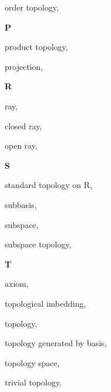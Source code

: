 \begin{multicols}{2}
order topology, \pageref{def:OrderTopology}

\vspace{1em}\noindent\large{\textbf{P}}

product topology, \pageref{def:ProductTopology}

projection, \pageref{def:Projection}

\vspace{1em}\noindent\large{\textbf{R}}

ray, \pageref{def:Ray}

\hspace{1em}closed ray, \pageref{def:Ray}

\hspace{1em}open ray, \pageref{def:Ray}

\vspace{1em}\noindent\large{\textbf{S}}

standard topology on R, \pageref{def:StandardTopologyOnTheRealLine}

subbasis, \pageref{def:Subbasis}

subspace, \pageref{def:SubspaceTopology}

subspace topology, \pageref{def:SubspaceTopology}

\vspace{1em}\noindent\large{\textbf{T}}

 axiom, \pageref{def:T1Axiom}

topological imbedding, \pageref{def:TopologicalImbedding}

topology, \pageref{def:Topology}

topology generated by basis, \pageref{def:TopologyGeneratedByBasis}

topology space, \pageref{def:TopologySpace}

trivial topology, \pageref{def:TrivialTopology}

\end{multicols}